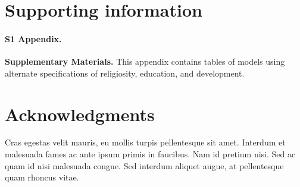 \documentclass[10pt,letterpaper]{article}
\begin{document}
\section*{Supporting information}

\paragraph*{S1 Appendix.}
\label{S1_Appendix}
{\bf Supplementary Materials.}  This appendix contains tables of models using alternate specifications of religiosity, education, and development.

\section*{Acknowledgments}
Cras egestas velit mauris, eu mollis turpis pellentesque sit amet. Interdum et malesuada fames ac ante ipsum primis in faucibus. Nam id pretium nisi. Sed ac quam id nisi malesuada congue. Sed interdum aliquet augue, at pellentesque quam rhoncus vitae.

\nolinenumbers
\end{document}
